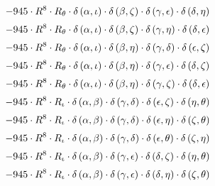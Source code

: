 \begin{subequations}
\begin{gather}
 \\[0.2em] \notag 		 - 945 \cdot R^{8} \cdot R_{\theta{}} \cdot \delta{}\left(\alpha{}, \iota{}\right) \cdot \delta{}\left(\beta{}, \zeta{}\right) \cdot \delta{}\left(\gamma{}, \epsilon{}\right) \cdot \delta{}\left(\delta{}, \eta{}\right) 
 \\[0.2em] \notag 		 - 945 \cdot R^{8} \cdot R_{\theta{}} \cdot \delta{}\left(\alpha{}, \iota{}\right) \cdot \delta{}\left(\beta{}, \zeta{}\right) \cdot \delta{}\left(\gamma{}, \eta{}\right) \cdot \delta{}\left(\delta{}, \epsilon{}\right) 
 \\[0.2em] \notag 		 - 945 \cdot R^{8} \cdot R_{\theta{}} \cdot \delta{}\left(\alpha{}, \iota{}\right) \cdot \delta{}\left(\beta{}, \eta{}\right) \cdot \delta{}\left(\gamma{}, \delta{}\right) \cdot \delta{}\left(\epsilon{}, \zeta{}\right) 
 \\[0.2em] \notag 		 - 945 \cdot R^{8} \cdot R_{\theta{}} \cdot \delta{}\left(\alpha{}, \iota{}\right) \cdot \delta{}\left(\beta{}, \eta{}\right) \cdot \delta{}\left(\gamma{}, \epsilon{}\right) \cdot \delta{}\left(\delta{}, \zeta{}\right) 
 \\[0.2em] \notag 		 - 945 \cdot R^{8} \cdot R_{\theta{}} \cdot \delta{}\left(\alpha{}, \iota{}\right) \cdot \delta{}\left(\beta{}, \eta{}\right) \cdot \delta{}\left(\gamma{}, \zeta{}\right) \cdot \delta{}\left(\delta{}, \epsilon{}\right) 
 \\[0.2em] \notag 		 - 945 \cdot R^{8} \cdot R_{\iota{}} \cdot \delta{}\left(\alpha{}, \beta{}\right) \cdot \delta{}\left(\gamma{}, \delta{}\right) \cdot \delta{}\left(\epsilon{}, \zeta{}\right) \cdot \delta{}\left(\eta{}, \theta{}\right) 
 \\[0.2em] \notag 		 - 945 \cdot R^{8} \cdot R_{\iota{}} \cdot \delta{}\left(\alpha{}, \beta{}\right) \cdot \delta{}\left(\gamma{}, \delta{}\right) \cdot \delta{}\left(\epsilon{}, \eta{}\right) \cdot \delta{}\left(\zeta{}, \theta{}\right) 
 \\[0.2em] \notag 		 - 945 \cdot R^{8} \cdot R_{\iota{}} \cdot \delta{}\left(\alpha{}, \beta{}\right) \cdot \delta{}\left(\gamma{}, \delta{}\right) \cdot \delta{}\left(\epsilon{}, \theta{}\right) \cdot \delta{}\left(\zeta{}, \eta{}\right) 
 \\[0.2em] \notag 		 - 945 \cdot R^{8} \cdot R_{\iota{}} \cdot \delta{}\left(\alpha{}, \beta{}\right) \cdot \delta{}\left(\gamma{}, \epsilon{}\right) \cdot \delta{}\left(\delta{}, \zeta{}\right) \cdot \delta{}\left(\eta{}, \theta{}\right) 
 \\[0.2em] \notag 		 - 945 \cdot R^{8} \cdot R_{\iota{}} \cdot \delta{}\left(\alpha{}, \beta{}\right) \cdot \delta{}\left(\gamma{}, \epsilon{}\right) \cdot \delta{}\left(\delta{}, \eta{}\right) \cdot \delta{}\left(\zeta{}, \theta{}\right) 

\end{gather}
\end{subequations}
